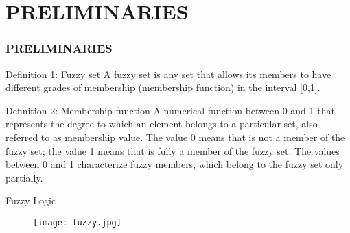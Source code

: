 \documentclass[serif, aspectratio=169]{beamer}
\newtheorem{thm co}{Theorem contd...}
\begin{document}
\section{PRELIMINARIES}
\begin{frame}
\frametitle<presentation>{PRELIMINARIES}
\begin{block} {Definition 1: Fuzzy set}
\hspace{1em}A fuzzy set is any set that allows its members to have different grades of membership (membership function) in the interval [0,1]. 
\end{block}
\begin{block}{Definition 2: Membership function}
\hspace{1em}A numerical function between 0 and 1 that represents the degree to which an element belongs to a particular set, also referred to as membership value. The value 0 means that is not a member of the fuzzy set; the value 1 means that is fully a member of the fuzzy set. The values between 0 and 1 characterize fuzzy members, which belong to the fuzzy set only partially.
\end{block} 
\end{frame}
\begin{frame}{Fuzzy Logic}
    \begin{figure}
        \centering
        \texttt{[image: fuzzy.jpg]}
    \end{figure}

\end{frame}
\end{document}

